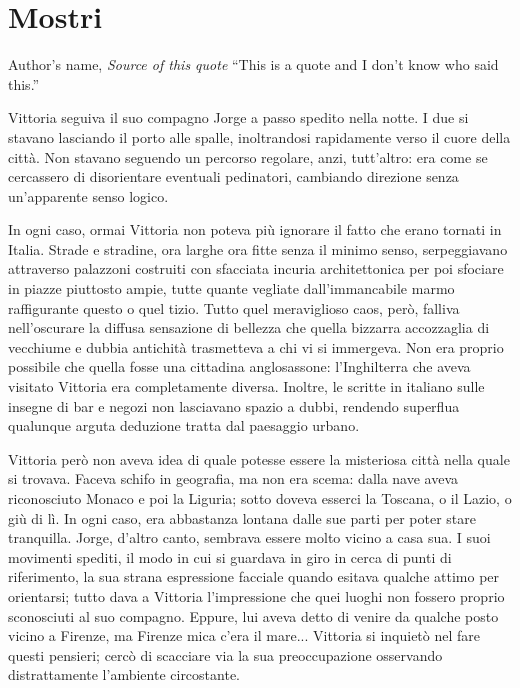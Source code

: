 \chapter{Mostri}

\begin{chapquote}{Author's name, \textit{Source of this quote}}
``This is a quote and I don't know who said this.''
\end{chapquote}


Vittoria seguiva il suo compagno Jorge a passo spedito nella notte. I due si stavano lasciando il porto alle spalle, inoltrandosi rapidamente verso il cuore della città. Non stavano seguendo un percorso regolare, anzi, tutt'altro: era come se cercassero di disorientare eventuali pedinatori, cambiando direzione senza un'apparente senso logico.

In ogni caso, ormai Vittoria non poteva più ignorare il fatto che erano tornati in Italia. Strade e stradine, ora larghe ora fitte senza il minimo senso, serpeggiavano attraverso palazzoni costruiti con sfacciata incuria architettonica per poi sfociare in piazze piuttosto ampie, tutte quante vegliate dall'immancabile marmo raffigurante questo o quel tizio. Tutto quel meraviglioso caos, però, falliva nell'oscurare la diffusa sensazione di bellezza che quella bizzarra accozzaglia di vecchiume e dubbia antichità trasmetteva a chi vi si immergeva. Non era proprio possibile che quella fosse una cittadina anglosassone: l'Inghilterra che aveva visitato Vittoria era completamente diversa. Inoltre, le scritte in italiano sulle insegne di bar e negozi non lasciavano spazio a dubbi, rendendo superflua qualunque arguta deduzione tratta dal paesaggio urbano.

Vittoria però non aveva idea di quale potesse essere la misteriosa città nella quale si trovava. Faceva schifo in geografia, ma non era scema: dalla nave aveva riconosciuto Monaco e poi la Liguria; sotto doveva esserci la Toscana, o il Lazio, o giù di lì. In ogni caso, era abbastanza lontana dalle sue parti per poter stare tranquilla. Jorge, d'altro canto, sembrava essere molto vicino a casa sua. I suoi movimenti spediti, il modo in cui si guardava in giro in cerca di punti di riferimento, la sua strana espressione facciale quando esitava qualche attimo per orientarsi; tutto dava a Vittoria l'impressione che quei luoghi non fossero proprio sconosciuti al suo compagno. Eppure, lui aveva detto di venire da qualche posto vicino a Firenze, ma Firenze mica c'era il mare... Vittoria si inquietò nel fare questi pensieri; cercò di scacciare via la sua preoccupazione osservando distrattamente l'ambiente circostante.

